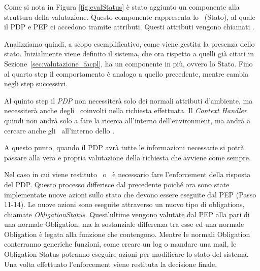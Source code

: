 Come si nota in Figura \ref{fig:evalStatus} è stato aggiunto un componente alla struttura della valutazione.
Questo componente rappresenta lo \status \ (Stato), al quale il \ac{PDP} e \ac{PEP} ci accedono tramite attributi.
Questi attributi vengono chiamati \statusattribute. \par
Analizziamo quindi, a scopo esemplificativo, come viene gestita la presenza dello stato. Inizialmente viene definito il sistema, che ora rispetto a quelli già citati in Sezione~\ref{sec:valutazione_facpl}, ha un componente in più, ovvero lo Stato.
Fino al quarto step il comportamento è analogo a quello precedente, mentre cambia negli step successivi.\\ \par
Al quinto step il \textit{PDP} non necessiterà solo dei normali attributi d'ambiente, ma necessiterà anche degli \statusattribute \ coinvolti nella richiesta effettuata. Il \textit{Context Handler} quindi non andrà solo a fare la ricerca all'interno dell'environment, ma andrà a cercare anche gli \statusattribute \ all'interno dello \status.\\ \par
A questo punto, quando il \ac{PDP} avrà tutte le informazioni necessarie si potrà passare alla vera e propria valutazione della richiesta che avviene come sempre.\\ \par
Nel caso in cui viene restituto \permit \ o \deny \ è necessario fare l'enforcement della risposta del \ac{PDP}. Questo processo differisce dal precedente poiché ora sono state implementate nuove azioni sullo stato che devono essere eseguite dal \ac{PEP} (Passo 11-14). Le nuove azioni sono eseguite attraverso un nuovo tipo di obligations, chiamate \textit{ObligationStatus}. 
Quest'ultime vengono valutate dal \ac{PEP} alla pari di una normale Obligation, ma la sostanziale differenza tra esse ed una normale Obligation è legata alla funzione che contengono. Mentre le normali Obligation conterranno generiche funzioni, come creare un log o mandare una mail, le Obligation Status potranno eseguire azioni per modificare lo stato del sistema.
Una volta effettuato l'enforcement viene restituta la decisione finale.




